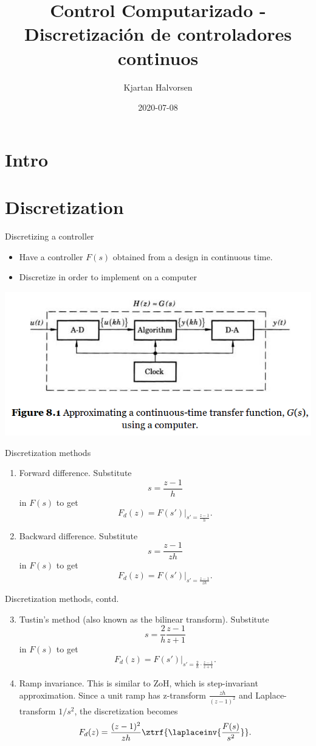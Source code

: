 \documentclass[presentation,aspectratio=1610]{beamer}
\author{Kjartan Halvorsen}
\date{2020-07-08}
\title{Control Computarizado - Discretización de controladores continuos}
\begin{document}
\maketitle


\section{Intro}
\label{sec:org8f7554b}

\section{Discretization}
\label{sec:org9f28dad}
\begin{frame}[label={sec:orgce53e41}]{Discretizing a controller}
\begin{itemize}
\item Have a controller \(F(s)\) obtained from a design in continuous time.
\item Discretize in order to implement on a computer
\end{itemize}

\begin{center}
\includegraphics[width=0.7\linewidth]{../../figures/fig8-1.png}
\end{center}
\end{frame}

\begin{frame}[label={sec:org51419b3}]{Discretization methods}
\begin{enumerate}
\item Forward difference. Substitute 
\[ s = \frac{z-1}{h} \] in \(F(s)\) to get
\[ F_d(z) = F(s')|_{s'=\frac{z-1}{h}}. \]
\item Backward difference. Substitute 
\[ s = \frac{z-1}{zh} \] in \(F(s)\) to get
\[ F_d(z) = F(s')|_{s'=\frac{z-1}{zh}}. \]
\end{enumerate}
\end{frame}
\begin{frame}[label={sec:org44a4d27}]{Discretization methods, contd.}
\begin{enumerate}
\setcounter{enumi}{2}
\item Tustin's method (also known as the bilinear transform). Substitute
\[ s = \frac{2}{h}\frac{z-1}{z+1} \] in \(F(s)\) to get
\[ F_d(z) = F(s')|_{s'=\frac{2}{h}\cdot \frac{z-1}{z+1}}. \]
\item Ramp invariance. This is similar to ZoH, which is step-invariant approximation. 
Since a unit ramp has z-transform \(\frac{zh}{(z-1)^2}\) and Laplace-transform \(1/s^2\),  the discretization becomes
\[ F_d(z) = \frac{(z-1)^2}{zh} \ztrf{\laplaceinv{\frac{F(s)}{s^2}}}. \]
\end{enumerate}
\end{frame}
\end{document}
